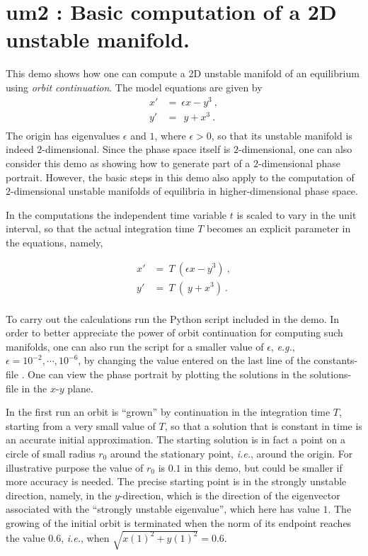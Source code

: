 \documentclass[12pt]{report}
\def\eps{\epsilon}
\begin{document}
\section{ um2 : Basic computation of a 2D unstable manifold.} \label{sec:Demos_um2}
This demo shows how one can compute a 2D unstable manifold of an equilibrium
using {\it orbit continuation}.
The model equations are given by
\begin{equation} \begin{array}{cl}
 x' &= ~\eps x - y^3~, \\
 y' &=   ~~y + x^3~. \\
\end{array} \end{equation}
The origin has eigenvalues $\eps$ and $1$, where $\eps>0$, so that its 
unstable manifold is indeed $2$-dimensional. Since the phase space itself 
is $2$-dimensional, one can also consider this demo as showing how to generate 
part of a $2$-dimensional phase portrait. However, the basic steps in this demo 
also apply to the computation of $2$-dimensional unstable manifolds of equilibria 
in higher-dimensional phase space.

In the computations the independent time variable $t$ is scaled to vary in
the unit interval, so that the actual integration time $T$ becomes an 
explicit parameter in the equations, namely,

\begin{equation} \begin{array}{cl}
 x' &= ~T~(\eps x - y^3)~, \\
 y' &=      ~T~(~y + x^3)~. \\
\end{array} \end{equation}

To carry out the calculations run the Python script  included 
in the demo. In order to better appreciate the power of orbit continuation 
for computing such manifolds, one can also run the script for a smaller value 
of $\eps$, {\it e.g.}, $\eps=10^{-2},\cdots,10^{-6}$, by changing the value
entered on the last line of the constants-file . One can view
the phase portrait by plotting the solutions in the solutions-file 
in the $x$-$y$ plane.

In the first run an orbit is ``grown'' by continuation in the integration time 
$T$, starting from a very small value of $T$, so that a solution that is
constant in time is an accurate initial approximation. The starting solution is 
in fact a point on a circle of small radius $r_0$ around the stationary point,
{\it i.e.}, around the origin. For illustrative purpose the value of $r_0$ is
$0.1$ in this demo, but could be smaller if more accuracy is needed.
The precise starting point is in the strongly unstable direction, namely, in 
the $y$-direction, which is the direction of the eigenvector associated with 
the ``strongly unstable eigenvalue'', which here has value $1$. 
The growing of the initial orbit is terminated when the norm of its endpoint 
reaches the value 0.6, {\it i.e.}, when $\sqrt{x(1)^2+y(1)^2}=0.6$. 
\end{document}

